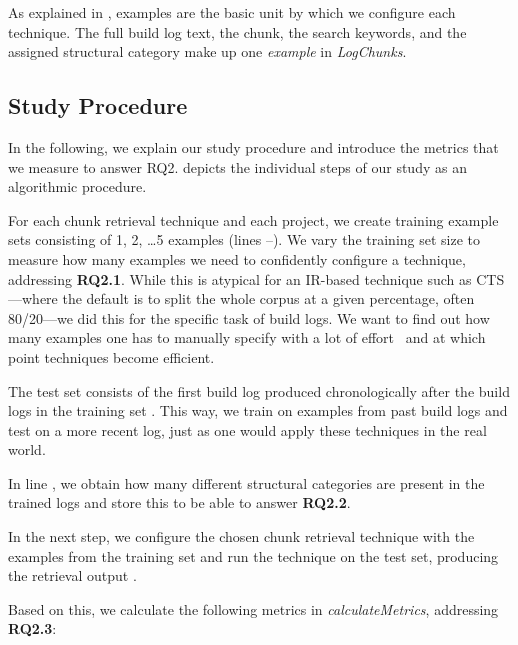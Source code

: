 As explained in , examples are the basic
unit by which we configure each technique.
The full build log text,
the chunk, the search keywords, and the assigned
structural category make
up one \emph{example} in \emph{LogChunks}.

\subsection{Study Procedure}

In the following, we explain our study procedure
and introduce the metrics that
we measure to answer RQ2.
 depicts the individual steps of our study as an
algorithmic procedure.

For each chunk retrieval technique and each project, we create
training example sets consisting of 1, 2, \dots 5 examples (lines
--).
We vary the training set size to measure how many examples we need to
confidently configure a technique, addressing \textbf{RQ2.1}.
While this is atypical for an IR-based technique such as CTS---where
the default is to split the whole corpus at a given percentage, often
80/20---we did this for the specific task of build logs.
We want to find out how many examples one has to manually specify with a
lot of effort~ and at which point techniques
become efficient.

The test set consists of the first build log produced
chronologically after the build logs in the training set .
This way, we train on examples from past build logs and test on
a more recent log, just as one would apply these techniques in the
real world.

In line , we obtain how many different structural categories
are present in the trained logs and store this to be able to answer
\textbf{RQ2.2}.

In the next step, we configure the chosen chunk retrieval technique with
the examples from the training set  and run the technique
on the
test set, producing the retrieval output .

Based on this, we calculate the following metrics in
\emph{calculateMetrics}, addressing \textbf{RQ2.3}:

